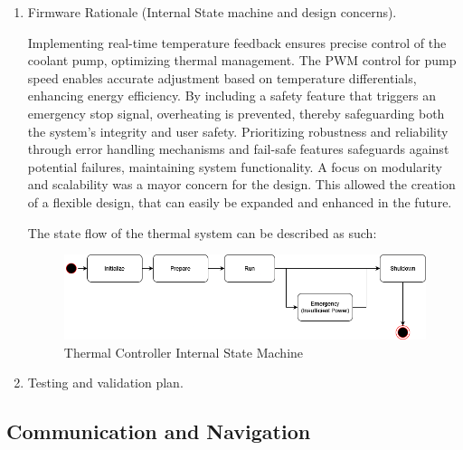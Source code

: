 \begin{enumerate}
\begin{enumerate}
            \item Firmware Rationale (Internal State machine and design concerns).

        Implementing real-time temperature feedback ensures precise control of the coolant pump, optimizing thermal management. The PWM control for pump speed enables accurate adjustment based on temperature differentials, enhancing energy efficiency. By including a safety feature that triggers an emergency stop signal, overheating is prevented, thereby safeguarding both the system's integrity and user safety. Prioritizing robustness and reliability through error handling mechanisms and fail-safe features safeguards against potential failures, maintaining system functionality. A focus on modularity and scalability was a mayor concern for the design. This allowed the creation of a flexible design, that can easily be expanded and enhanced in the future.

        The state flow of the thermal system can be described as such:
        \begin{figure}[H]
            \centering
            \includegraphics[width=0.7\linewidth]{texfiles/elec/eimg/ThermoStateflow.png}
            \caption{Thermal Controller Internal State Machine}
            \label{fig:Thermal stateflow}
        \end{figure}


            \item Testing and validation plan.
        \end{enumerate}
\end{enumerate}

\subsection{Communication and Navigation}
